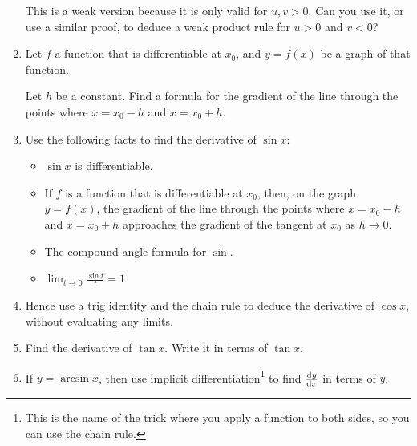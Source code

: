 \begin{enumerate}
  This is a weak version because it is only valid for \(u, v > 0\). Can you use
  it, or use a similar proof, to deduce a weak product rule for
  \(u > 0\) and \(v < 0\)?
 \item
  Let \(f\) a function that is differentiable at \(x_0\), and \(y = f(x)\) be a
  graph of that function.

  Let \(h\) be a constant. Find a formula for the gradient of the line through
  the points where \(x = x_0 - h\) and \(x = x_0 + h\).
 \item
  Use the following facts to find the derivative of \(\sin x\):
  \begin{itemize}
   \item
    \(\sin x\) is differentiable.
   \item
    If \(f\) is a function that is differentiable at \(x_0\), then, on the graph
    \(y = f(x)\), the gradient of the line through the points where
    \(x = x_0 - h\) and \(x = x_0 + h\) approaches the gradient of the tangent
    at \(x_0\) as \(h \to 0\).
   \item
    The compound angle formula for \(\sin\).
   \item
    \(\displaystyle
     \lim_{t \to 0} \frac{\sin t} t = 1
     \)
  \end{itemize}
 \item
  Hence use a trig identity and the chain rule to deduce the derivative of
  \(\cos x\), without evaluating any limits.
 \item
  Find the derivative of \(\tan x\). Write it in terms of \(\tan x\).
 \item \label{q_calc_arcsin}
  If \(y = \arcsin x\), then use implicit differentiation\footnote{
   This is the name of the trick where you apply a function to both sides, so
   you can use the chain rule.
  } to find
  \(\dv<y>{x}\) in terms of \(y\).


\end{enumerate}
